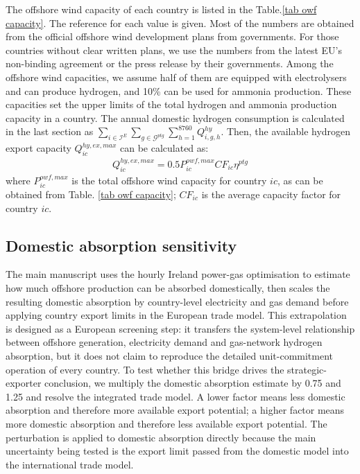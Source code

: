 \documentclass[sn-mathphys,Numbered]{sn-jnl}%
\theoremstyle{thmstyleone}%
\theoremstyle{thmstyletwo}%
\theoremstyle{thmstylethree}%
\begin{document}
The offshore wind capacity of each country is listed in the Table.\ref{tab owf capacity}. The reference for each value is given. Most of the numbers are obtained from the official offshore wind development plans from governments. For those countries without clear written plans, we use the numbers from the latest EU's non-binding agreement or the press release by their governments. Among the offshore wind capacities, we assume half of them are equipped with electrolysers and can produce hydrogen, and 10\% can be used for ammonia production. These capacities set the upper limits of the total hydrogen and ammonia production capacity in a country. The annual domestic hydrogen consumption is calculated in the last section as $\sum_{i \in \mathcal{I}^E} \sum_{g \in \mathcal{G}^{ptg}} \sum_{h=1}^{8760} Q_{i,g,h}^{hy}$. Then, the available hydrogen export capacity $Q_{ic}^{hy,ex,max}$ can be calculated as:
\begin{align}
    Q_{ic}^{hy,ex,max} = 0.5 P_{ic}^{owf,max}  CF_{ic} \eta^{ptg}
\end{align}
where $P_{ic}^{owf,max}$ is the total offshore wind capacity for country $ic$, as can be obtained from Table. \ref{tab owf capacity}; $CF_{ic}$ is the average capacity factor for country $ic$.

\subsection{Domestic absorption sensitivity}

The main manuscript uses the hourly Ireland power-gas optimisation to estimate how much offshore production can be absorbed domestically, then scales the resulting domestic absorption by country-level electricity and gas demand before applying country export limits in the European trade model. This extrapolation is designed as a European screening step: it transfers the system-level relationship between offshore generation, electricity demand and gas-network hydrogen absorption, but it does not claim to reproduce the detailed unit-commitment operation of every country. To test whether this bridge drives the strategic-exporter conclusion, we multiply the domestic absorption estimate by 0.75 and 1.25 and resolve the integrated trade model. A lower factor means less domestic absorption and therefore more available export potential; a higher factor means more domestic absorption and therefore less available export potential. The perturbation is applied to domestic absorption directly because the main uncertainty being tested is the export limit passed from the domestic model into the international trade model.
\end{document}
